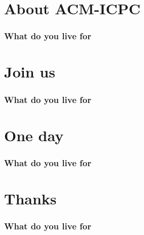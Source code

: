 \documentclass{beamer}
\begin{document}
\section{About ACM-ICPC}
\begin{frame}
\frametitle{What do you live for}

\end{frame}


\section{Join us}
\begin{frame}
\frametitle{What do you live for}

\end{frame}


\section{One day}
\begin{frame}
\frametitle{What do you live for}

\end{frame}


\section{Thanks}
\begin{frame}
\frametitle{What do you live for}

\end{frame}

  
 
\end{document}
